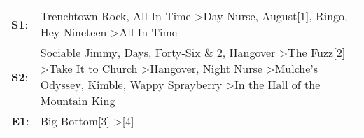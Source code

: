 \begin{supertabular}{p{0.03\textwidth}p{0.92\textwidth}}
 \textbf{S1}:  &                                                                                                                                                                                                                                                                               Trenchtown Rock\textsuperscript{}, \enspace All In Time\textsuperscript{} \textgreater \enspace Day Nurse\textsuperscript{}, \enspace August[1]\textsuperscript{}, \enspace Ringo\textsuperscript{}, \enspace Hey Nineteen\textsuperscript{} \textgreater \enspace All In Time\textsuperscript{}  \enspace  \\
 \textbf{S2}:  &  Sociable Jimmy\textsuperscript{},  Days\textsuperscript{}, \enspace Forty-Six \& 2\textsuperscript{}, \enspace Hangover\textsuperscript{} \textgreater \enspace The Fuzz[2]\textsuperscript{} \textgreater \enspace Take It to Church\textsuperscript{} \textgreater \enspace Hangover\textsuperscript{}, \enspace Night Nurse\textsuperscript{} \textgreater \enspace Mulche's Odyssey\textsuperscript{}, \enspace Kimble\textsuperscript{}, \enspace Wappy Sprayberry\textsuperscript{} \textgreater \enspace In the Hall of the Mountain King\textsuperscript{}  \enspace  \\
 \textbf{E1}:  &                                                                                                                                                                                                                                                                                                                                                                                                                                                                                                Big Bottom[3]\textsuperscript{} \textgreater {}[4]\textsuperscript{}  \enspace  \\
\end{supertabular}
